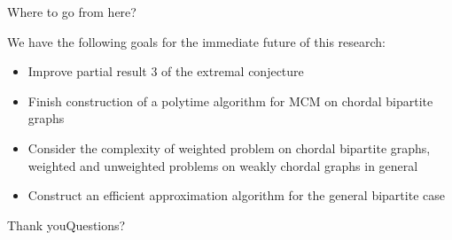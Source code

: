 \documentclass{beamer}
\newcommand{\bframe}[2]{\begin{frame}{#1}#2\end{frame}}
\begin{document}
\bframe{Where to go from here?}{

We have the following goals for the immediate future of this research:
\begin{itemize}\pause
	\item Improve partial result 3 of the extremal conjecture \pause
	\item Finish construction of a polytime algorithm for MCM on chordal bipartite graphs \pause
	\item Consider the complexity of weighted problem on chordal bipartite graphs, weighted and unweighted problems on weakly chordal graphs in general \pause
	\item Construct an efficient approximation algorithm for the general bipartite case 
\end{itemize}
}
\bframe{Thank you}{Questions?}

\end{document}
